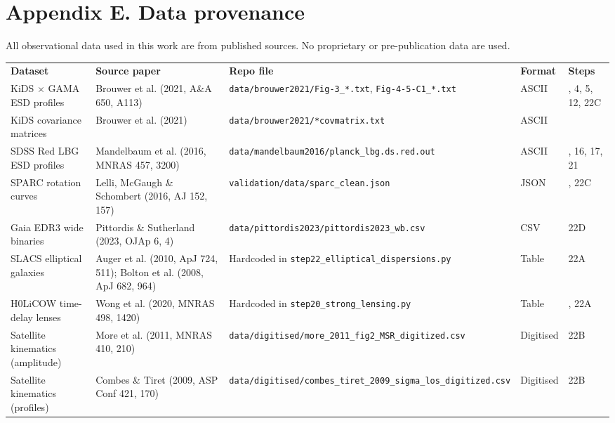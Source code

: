 \documentclass[11pt,a4paper]{article}
\begin{document}
\section{Appendix E. Data provenance}
\label{sec:appendix-e}
All observational data used in this work are from published sources. No proprietary or pre-publication data are used.

\begin{table}[H]
\centering
\footnotesize
\begin{tabularx}{\linewidth}{l>{\RaggedRight\arraybackslash}X>{\RaggedRight\arraybackslash}X>{\RaggedRight\arraybackslash}X>{\RaggedRight\arraybackslash}X}
\toprule
\textbf{Dataset} & \textbf{Source paper} & \textbf{Repo file} & \textbf{Format} & \textbf{Steps} \tabularnewline
KiDS $\times$ GAMA ESD profiles & Brouwer et al. (2021, A\&A 650, A113) & \texttt{data/\allowbreak{}brouwer2021/\allowbreak{}Fig-3\_\allowbreak{}*.txt}, \texttt{Fig-4-5-C1\_\allowbreak{}*.txt} & ASCII & 1, 4, 5, 12, 22C \tabularnewline
KiDS covariance matrices & Brouwer et al. (2021) & \texttt{data/\allowbreak{}brouwer2021/\allowbreak{}*covmatrix.txt} & ASCII & 12 \tabularnewline
SDSS Red LBG ESD profiles & Mandelbaum et al. (2016, MNRAS 457, 3200) & \texttt{data/\allowbreak{}mandelbaum2016/\allowbreak{}planck\_\allowbreak{}lbg.ds.red.out} & ASCII & 15, 16, 17, 21 \tabularnewline
SPARC rotation curves & Lelli, McGaugh \& Schombert (2016, AJ 152, 157) & \texttt{validation/\allowbreak{}data/\allowbreak{}sparc\_\allowbreak{}clean.json} & JSON & 10, 22C \tabularnewline
Gaia EDR3 wide binaries & Pittordis \& Sutherland (2023, OJAp 6, 4) & \texttt{data/\allowbreak{}pittordis2023/\allowbreak{}pittordis2023\_\allowbreak{}wb.csv} & CSV & 22D \tabularnewline
SLACS elliptical galaxies & Auger et al. (2010, ApJ 724, 511); Bolton et al. (2008, ApJ 682, 964) & Hardcoded in \texttt{step22\_\allowbreak{}elliptical\_\allowbreak{}dispersions.py} & Table & 22A \tabularnewline
H0LiCOW time-delay lenses & Wong et al. (2020, MNRAS 498, 1420) & Hardcoded in \texttt{step20\_\allowbreak{}strong\_\allowbreak{}lensing.py} & Table & 20, 22A \tabularnewline
Satellite kinematics (amplitude) & More et al. (2011, MNRAS 410, 210) & \texttt{data/\allowbreak{}digitised/\allowbreak{}more\_\allowbreak{}2011\_\allowbreak{}fig2\_\allowbreak{}MSR\_\allowbreak{}digitized.csv} & Digitised & 22B \tabularnewline
Satellite kinematics (profiles) & Combes \& Tiret (2009, ASP Conf 421, 170) & \texttt{data/\allowbreak{}digitised/\allowbreak{}combes\_\allowbreak{}tiret\_\allowbreak{}2009\_\allowbreak{}sigma\_\allowbreak{}los\_\allowbreak{}digitized.csv} & Digitised & 22B \tabularnewline
\bottomrule
\end{tabularx}
\end{table}
\end{document}

